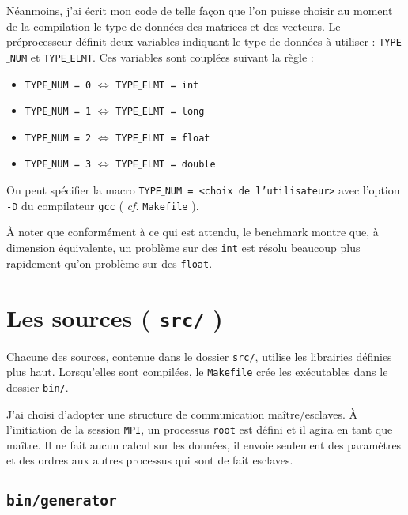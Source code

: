 \documentclass[a4paper,10pt]{article}
\begin{document}
\bigskip

Néanmoins, j'ai écrit mon code de telle façon que l'on puisse choisir au moment de la compilation le type de données des matrices et des vecteurs. Le préprocesseur définit deux variables indiquant le type de données à utiliser : \texttt{TYPE$\_$NUM} et \texttt{TYPE$\_$ELMT}. Ces variables sont couplées suivant la règle : 

\medskip

\begin{itemize}
  \item \texttt{TYPE$\_$NUM = 0} $\Longleftrightarrow$ \texttt{TYPE$\_$ELMT = int}
  \item \texttt{TYPE$\_$NUM = 1} $\Longleftrightarrow$ \texttt{TYPE$\_$ELMT = long}
  \item \texttt{TYPE$\_$NUM = 2} $\Longleftrightarrow$ \texttt{TYPE$\_$ELMT = float}
  \item \texttt{TYPE$\_$NUM = 3} $\Longleftrightarrow$ \texttt{TYPE$\_$ELMT = double}
\end{itemize}

\bigskip

On peut spécifier la macro \texttt{TYPE$\_$NUM = <choix de l'utilisateur>} avec l'option \texttt{-D} du compilateur \texttt{gcc} ( \textit{cf.} \texttt{Makefile} ).

\bigskip

À noter que conformément à ce qui est attendu, le benchmark montre que, à dimension équivalente, un problème sur des \texttt{int} est résolu beaucoup plus rapidement qu'on problème sur des \texttt{float}.

\section{Les sources ( \texttt{src/} )}

Chacune des sources, contenue dans le dossier \texttt{src/}, utilise les librairies définies plus haut. Lorsqu'elles sont compilées, le \texttt{Makefile} crée les exécutables dans le dossier \texttt{bin/}.

\bigskip

J'ai choisi d'adopter une structure de communication maître/esclaves. À l'initiation de la session \texttt{MPI}, un processus \texttt{root} est défini et il agira en tant que maître. Il ne fait aucun calcul sur les données, il envoie seulement des paramètres et des ordres aux autres processus qui sont de fait esclaves.

\subsection{\texttt{bin/generator}}
\end{document}
